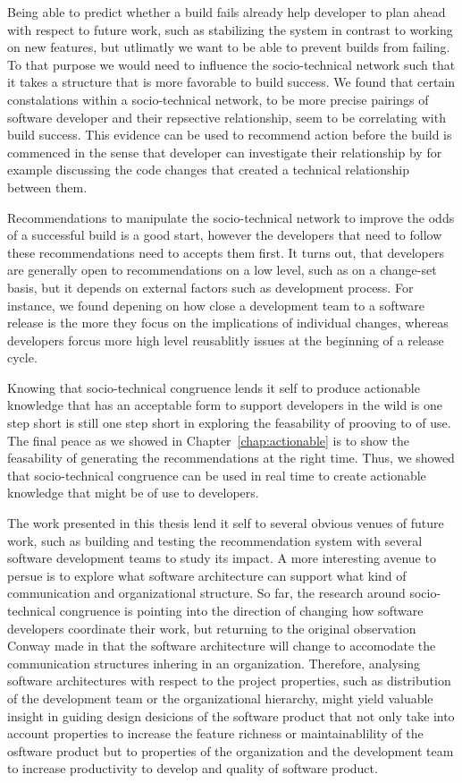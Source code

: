 Being able to predict whether a build fails already help developer to plan ahead with respect to future work, such as stabilizing the system in contrast to working on new features, but utlimatly we want to be able to prevent builds from failing.
To that purpose we would need to influence the socio-technical network such that it takes a structure that is more favorable to build success.
We found that certain constalations within a socio-technical network, to be more precise pairings of software developer and their repsective relationship, seem to be correlating with build success.
This evidence can be used to recommend action before the build is commenced in the sense that developer can investigate their relationship by for example discussing the code changes that created a technical relationship between them.

Recommendations to manipulate the socio-technical network to improve the odds of a successful build is a good start, however the developers that need to follow these recommendations need to accepts them first.
It turns out, that developers are generally open to recommendations on a low level, such as on a change-set basis, but it depends on external factors such as development process.
For instance, we found depening on how close a development team to a software release is the more they focus on the implications of individual changes, whereas developers forcus more high level reusablitly issues at the beginning of a release cycle.

Knowing that socio-technical congruence lends it self to produce actionable knowledge that has an acceptable form to support developers in the wild is one step short is still one step short in exploring the feasability of prooving to of use.
The final peace as we showed in Chapter~\ref{chap:actionable} is to show the feasability of generating the recommendations at the right time.
Thus, we showed that socio-technical congruence can be used in real time to create actionable knowledge that might be of use to developers.

The work presented in this thesis lend it self to several obvious venues of future work, such as building and testing the recommendation system with several software development teams to study its impact.
A more interesting avenue to persue is to explore what software architecture can support what kind of communication and organizational structure.
So far, the research around socio-technical congruence is pointing into the direction of changing how software developers coordinate their work, but returning to the original observation Conway made in that the software architecture will change to accomodate the communication structures inhering in an organization.
Therefore, analysing software architectures with respect to the project properties, such as distribution of the development team or the organizational hierarchy, might yield valuable insight in guiding design desicions of the software product that not only take into account properties to increase the feature richness or maintainablility of the osftware product but to properties of the organization and the development team to increase productivity to develop and quality of software product. 
